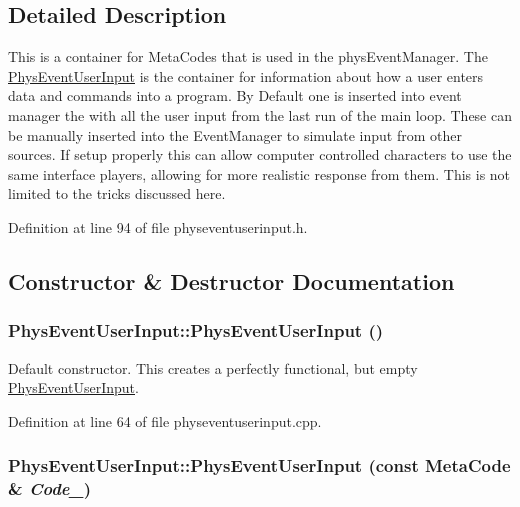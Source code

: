 \subsection{Detailed Description}
This is a container for MetaCodes that is used in the physEventManager. The \hyperlink{classPhysEventUserInput}{PhysEventUserInput} is the container for information about how a user enters data and commands into a program. By Default one is inserted into event manager the with all the user input from the last run of the main loop. These can be manually inserted into the EventManager to simulate input from other sources. If setup properly this can allow computer controlled characters to use the same interface players, allowing for more realistic response from them. This is not limited to the tricks discussed here. 

Definition at line 94 of file physeventuserinput.h.

\subsection{Constructor \& Destructor Documentation}
\hypertarget{classPhysEventUserInput_a6f8eaf698e8109d5cb30f2f17044f1ba}{
\subsubsection[{PhysEventUserInput}]{\setlength{\rightskip}{0pt plus 5cm}PhysEventUserInput::PhysEventUserInput ()}}
\label{dc/d0e/classPhysEventUserInput_a6f8eaf698e8109d5cb30f2f17044f1ba}


Default constructor. This creates a perfectly functional, but empty \hyperlink{classPhysEventUserInput}{PhysEventUserInput}. 

Definition at line 64 of file physeventuserinput.cpp.\hypertarget{classPhysEventUserInput_ae13b1b02bfa3ef64dc4205478a68810f}{
\subsubsection[{PhysEventUserInput}]{\setlength{\rightskip}{0pt plus 5cm}PhysEventUserInput::PhysEventUserInput (const {\bf MetaCode} \& {\em Code\_\-})}}
\label{dc/d0e/classPhysEventUserInput_ae13b1b02bfa3ef64dc4205478a68810f}


